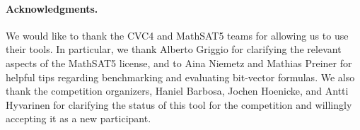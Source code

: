 \documentclass{easychair}
\newcommand{\msat}{MathSAT5\xspace}
\newcommand{\cvcfour}{CVC4\xspace}
\begin{document}
\paragraph{Acknowledgments.} We would like to thank the \cvcfour and \msat teams for allowing us
to use their tools. In particular, we thank Alberto Griggio
for clarifying the relevant aspects of the \msat license, and to Aina Niemetz
and Mathias Preiner for helpful tips regarding benchmarking and evaluating
bit-vector formulas. We also thank the competition organizers, Haniel Barbosa,
Jochen Hoenicke, and Antti Hyvarinen for clarifying the status of this tool for
the competition and willingly accepting it as a new participant.



  
  
\end{document}

